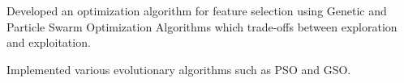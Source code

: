 \documentclass[]{myCV}
\begin{document}
\begin{minipage}[t]{0.6\textwidth}
\descript{}
\begin{tightemize}
\item Developed an optimization algorithm for feature selection using Genetic and Particle Swarm Optimization Algorithms which trade-offs between exploration and exploitation.
\item Implemented various evolutionary algorithms such as PSO and GSO.
\end{tightemize}
\sectionsep








\end{minipage}
\end{document}
